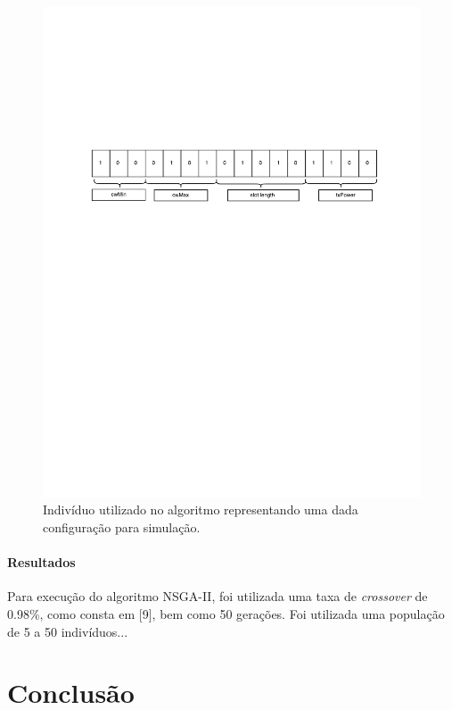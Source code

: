 \documentclass[conference]{IEEEtran}
\begin{document}
\begin{figure}[h]
  \centering
  \includegraphics[scale=0.25]{figures/bits-config.pdf}
  \caption{Indivíduo utilizado no algoritmo representando uma dada configuração para simulação.}
  \label{fig:bits-config}
\end{figure}


\paragraph{Resultados}

Para execução do algoritmo NSGA-II, foi utilizada uma taxa de \textit{crossover} de 0.98\%, como consta em [9], bem como 50 gerações.
Foi utilizada uma população de 5 a 50 indivíduos...


\section{Conclusão}

\nocite{*} %

%
%

\end{document}
